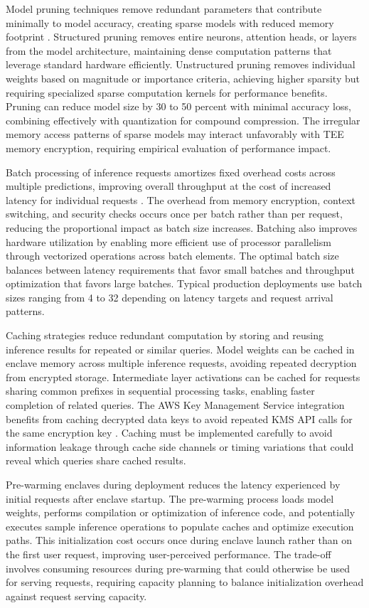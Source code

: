 Model pruning techniques remove redundant parameters that contribute minimally to model accuracy, creating sparse models with reduced memory footprint \cite{model_pruning}. Structured pruning removes entire neurons, attention heads, or layers from the model architecture, maintaining dense computation patterns that leverage standard hardware efficiently. Unstructured pruning removes individual weights based on magnitude or importance criteria, achieving higher sparsity but requiring specialized sparse computation kernels for performance benefits. Pruning can reduce model size by 30 to 50 percent with minimal accuracy loss, combining effectively with quantization for compound compression. The irregular memory access patterns of sparse models may interact unfavorably with TEE memory encryption, requiring empirical evaluation of performance impact.

Batch processing of inference requests amortizes fixed overhead costs across multiple predictions, improving overall throughput at the cost of increased latency for individual requests \cite{batch_processing}. The overhead from memory encryption, context switching, and security checks occurs once per batch rather than per request, reducing the proportional impact as batch size increases. Batching also improves hardware utilization by enabling more efficient use of processor parallelism through vectorized operations across batch elements. The optimal batch size balances between latency requirements that favor small batches and throughput optimization that favors large batches. Typical production deployments use batch sizes ranging from 4 to 32 depending on latency targets and request arrival patterns.

Caching strategies reduce redundant computation by storing and reusing inference results for repeated or similar queries. Model weights can be cached in enclave memory across multiple inference requests, avoiding repeated decryption from encrypted storage. Intermediate layer activations can be cached for requests sharing common prefixes in sequential processing tasks, enabling faster completion of related queries. The AWS Key Management Service integration benefits from caching decrypted data keys to avoid repeated KMS API calls for the same encryption key \cite{kms_integration}. Caching must be implemented carefully to avoid information leakage through cache side channels or timing variations that could reveal which queries share cached results.

Pre-warming enclaves during deployment reduces the latency experienced by initial requests after enclave startup. The pre-warming process loads model weights, performs compilation or optimization of inference code, and potentially executes sample inference operations to populate caches and optimize execution paths. This initialization cost occurs once during enclave launch rather than on the first user request, improving user-perceived performance. The trade-off involves consuming resources during pre-warming that could otherwise be used for serving requests, requiring capacity planning to balance initialization overhead against request serving capacity.

